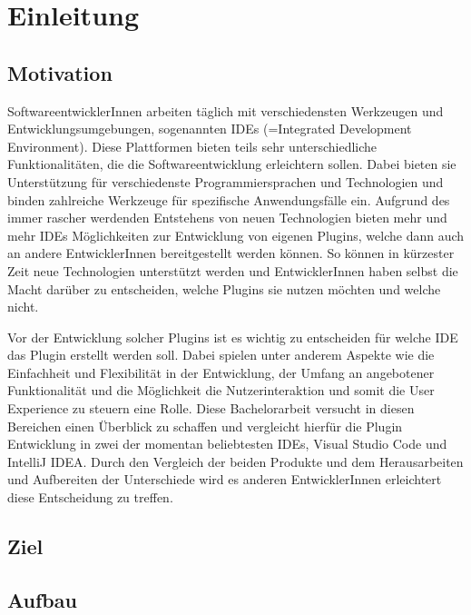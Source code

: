 \chapter{Einleitung}
\label{cha:Einleitung}


\section{Motivation}
\label{sec:Motivation}

SoftwareentwicklerInnen arbeiten täglich mit verschiedensten 
Werkzeugen und Entwicklungsumgebungen, sogenannten IDEs 
(=Integrated Development Environment). Diese Plattformen 
bieten teils sehr unterschiedliche Funktionalitäten, die 
die Softwareentwicklung erleichtern sollen. Dabei bieten 
sie Unterstützung für verschiedenste Programmiersprachen 
und Technologien und binden zahlreiche Werkzeuge für 
spezifische Anwendungsfälle ein. Aufgrund des immer rascher
werdenden Entstehens von neuen Technologien bieten mehr 
und mehr IDEs Möglichkeiten zur Entwicklung von eigenen 
Plugins, welche dann auch an andere EntwicklerInnen 
bereitgestellt werden können. So können in kürzester 
Zeit neue Technologien unterstützt werden und 
EntwicklerInnen haben selbst die Macht darüber zu 
entscheiden, welche Plugins sie nutzen möchten und 
welche nicht.

Vor der Entwicklung solcher Plugins ist es wichtig 
zu entscheiden für welche IDE das Plugin erstellt 
werden soll. Dabei spielen unter anderem Aspekte wie 
die Einfachheit und Flexibilität in der Entwicklung, 
der Umfang an angebotener Funktionalität und die Möglichkeit
die Nutzerinteraktion und somit die User Experience 
zu steuern eine Rolle. 
Diese Bachelorarbeit versucht in diesen Bereichen 
einen Überblick zu schaffen und vergleicht hierfür 
die Plugin Entwicklung in zwei der momentan beliebtesten 
IDEs, Visual Studio Code und IntelliJ IDEA. Durch den 
Vergleich der beiden Produkte und dem Herausarbeiten 
und Aufbereiten der Unterschiede wird es anderen 
EntwicklerInnen erleichtert diese Entscheidung zu treffen.


\section{Ziel}
\label{sec:Ziel}

\section{Aufbau}
\label{sec:Aufbau}